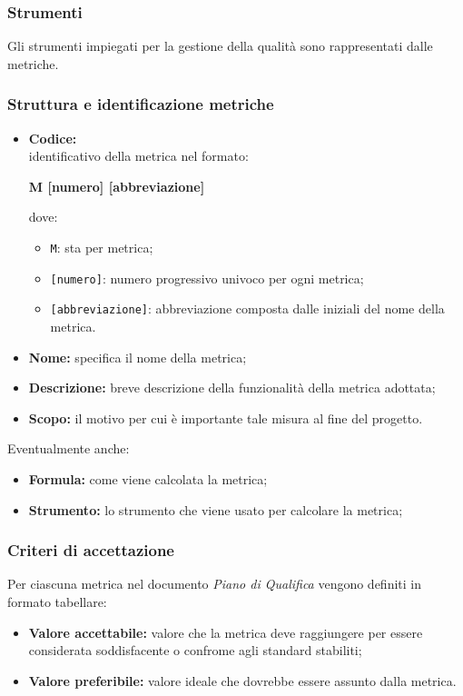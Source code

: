 
\subsubsection{Strumenti}
Gli strumenti impiegati per la gestione della qualità sono rappresentati dalle metriche.

\subsubsection{Struttura e identificazione metriche}
\begin{itemize}
    \item \textbf{Codice:} \\
    identificativo della metrica nel formato:
        \begin{center}
            \textbf{M [numero] [abbreviazione]}
        \end{center}
        dove:
        \begin{itemize}
            \item \texttt{M}: sta per metrica;
            \item \texttt{[numero]}: numero progressivo univoco per ogni metrica;
            \item \texttt{[abbreviazione]}: abbreviazione composta dalle iniziali del nome della metrica.
        \end{itemize}
    \item \textbf{Nome:} specifica il nome della metrica;
    \item \textbf{Descrizione:} breve descrizione della funzionalità della metrica adottata;
    \item \textbf{Scopo:} il motivo per cui è importante tale misura al fine del progetto.
\end{itemize}
    \vspace{0.2cm}
Eventualmente anche:
\begin{itemize}
    \item \textbf{Formula:} come viene calcolata la metrica;
    \item \textbf{Strumento:} lo strumento che viene usato per calcolare la metrica;
\end{itemize}

\subsubsection{Criteri di accettazione}
Per ciascuna metrica nel documento \textit{Piano di Qualifica} vengono definiti in formato tabellare:
\begin{itemize}
    \item \textbf{Valore accettabile:} valore che la metrica deve raggiungere per essere considerata soddisfacente o confrome agli standard stabiliti;
    \item \textbf{Valore preferibile:} valore ideale che dovrebbe essere assunto dalla metrica.
\end{itemize}

